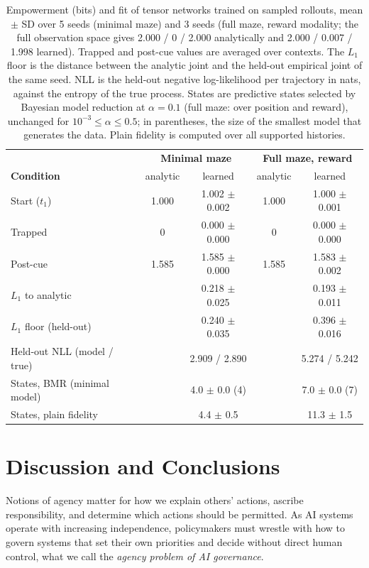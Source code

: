 \documentclass[letterpaper]{article} %
\theoremstyle{definition}
\begin{document}
\begin{table}[t]
\centering
{\small
\begin{tabular}{lcccc}
\hline
 & \multicolumn{2}{c}{\textbf{Minimal maze}} & \multicolumn{2}{c}{\textbf{Full maze, reward}} \\
\textbf{Condition} & analytic & learned & analytic & learned \\
\hline
Start ($t_1$) & 1.000 & 1.002 $\pm$ 0.002 & 1.000 & 1.000 $\pm$ 0.001 \\
Trapped & 0 & 0.000 $\pm$ 0.000 & 0 & 0.000 $\pm$ 0.000 \\
Post-cue & 1.585 & 1.585 $\pm$ 0.000 & 1.585 & 1.583 $\pm$ 0.002 \\
\hline
$L_1$ to analytic & & 0.218 $\pm$ 0.025 & & 0.193 $\pm$ 0.011 \\
$L_1$ floor (held-out) & & 0.240 $\pm$ 0.035 & & 0.396 $\pm$ 0.016 \\
Held-out NLL (model / true) & & 2.909 / 2.890 & & 5.274 / 5.242 \\
States, BMR (minimal model) & & 4.0 $\pm$ 0.0 (4) & & 7.0 $\pm$ 0.0 (7) \\
States, plain fidelity & & 4.4 $\pm$ 0.5 & & 11.3 $\pm$ 1.5 \\
\hline
\end{tabular}
}
\caption{Empowerment (bits) and fit of tensor networks trained on sampled rollouts, mean $\pm$ SD over 5 seeds (minimal maze) and 3 seeds (full maze, reward modality; the full observation space gives 2.000 / 0 / 2.000 analytically and 2.000 / 0.007 / 1.998 learned). Trapped and post-cue values are averaged over contexts. The $L_1$ floor is the distance between the analytic joint and the held-out empirical joint of the same seed. NLL is the held-out negative log-likelihood per trajectory in nats, against the entropy of the true process. States are predictive states selected by Bayesian model reduction at $\alpha = 0.1$ (full maze: over position and reward), unchanged for $10^{-3} \le \alpha \le 0.5$; in parentheses, the size of the smallest model that generates the data. Plain fidelity is computed over all supported histories.}
\label{tab:learned}
\end{table}

\section{Discussion and Conclusions}\label{sec:discussion}

Notions of agency matter for how we explain others' actions, ascribe responsibility, and determine which actions should be permitted. As AI systems operate with increasing independence, policymakers must wrestle with how to govern systems that set their own priorities and decide without direct human control, what we call the \emph{agency problem of AI governance}.
\end{document}

